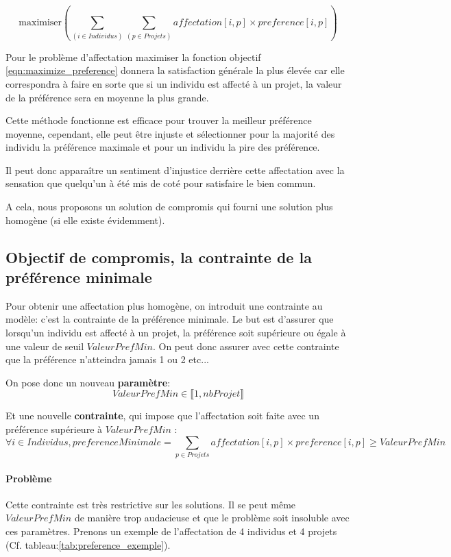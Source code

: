 \documentclass{polytech/polytech}
\begin{document}
\begin{equation}
\label{eqn:maximize_preference}
\text{maximiser} \left( \sum_{(i \in Individus)} \sum_{(p\in Projets)} affectation[i,p]\times preference[i,p] \right)
\end{equation}

Pour le problème d'affectation maximiser la fonction objectif \eqref{eqn:maximize_preference} donnera la satisfaction générale la plus élevée car elle correspondra à faire en sorte que si un individu est affecté à un projet, la valeur de la préférence sera en moyenne la plus grande.

Cette méthode fonctionne est efficace pour trouver la meilleur préférence moyenne, cependant, elle peut être injuste et sélectionner pour la majorité des individu la préférence maximale et pour un individu la pire des préférence.

Il peut donc apparaître un sentiment d'injustice derrière cette affectation avec la sensation que quelqu'un à été mis de coté pour satisfaire le bien commun.

A cela, nous proposons un solution de compromis qui fourni une solution plus homogène (si elle existe évidemment).

\subsection{Objectif de compromis, la contrainte de la préférence minimale}
\label{sec:pref_min}

Pour obtenir une affectation plus homogène, on introduit une contrainte au modèle: c'est la contrainte de la préférence minimale.
Le but est d'assurer que lorsqu'un individu est affecté à un projet, la préférence soit supérieure ou égale à une valeur de seuil $ValeurPrefMin$.
On peut donc assurer avec cette contrainte que la préférence n'atteindra jamais 1 ou 2 etc...

On pose donc un nouveau \textbf{paramètre}:
$$
ValeurPrefMin \in \llbracket 1,nbProjet \rrbracket
$$

Et une nouvelle \textbf{contrainte}, qui impose que l'affectation soit faite avec un préférence supérieure à $ValeurPrefMin$ :
$$
\forall i \in Individus ,preferenceMinimale = \sum_{p \in Projets} affectation[i,p]\times preference[i,p] \geqslant ValeurPrefMin
$$

\paragraph{Problème} Cette contrainte est très restrictive sur les solutions. Il se peut même $ValeurPrefMin$ de manière trop audacieuse et que le problème soit insoluble avec ces paramètres.
Prenons un exemple de l'affectation de 4 individus et 4 projets (Cf. tableau:\ref{tab:preference_exemple}).
\end{document}
